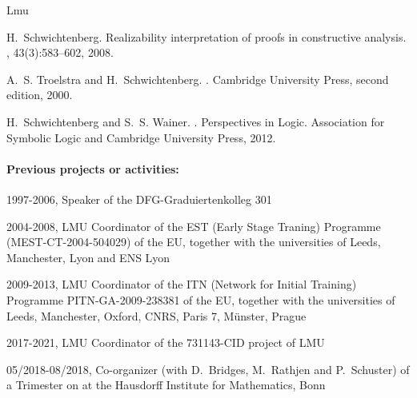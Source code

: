\begin{sitedescription}{Lmu}
\begin{compactitem}
\item H.~Schwichtenberg.
\newblock Realizability interpretation of proofs in constructive analysis.
, 43(3):583--602, 2008.

\item A.~S. Troelstra and H.~Schwichtenberg.
.
\newblock Cambridge University Press, second edition, 2000.

\item H.~Schwichtenberg and S.~S. Wainer.
.
\newblock Perspectives in Logic. Association for Symbolic Logic and Cambridge
  University Press, 2012.
\end{compactitem}

\paragraph*{Previous projects or activities:}

\begin{compactitem}
  \item 1997-2006, Speaker of the DFG-Graduiertenkolleg 301

\item 2004-2008, LMU Coordinator of the  EST (Early Stage Traning) Programme
   (MEST-CT-2004-504029) of the EU, together with the
universities of Leeds, Manchester, Lyon and ENS Lyon

\item 2009-2013, LMU Coordinator of the ITN (Network for Initial
    Training) Programme PITN-GA-2009-238381  of the
    EU, together with the universities of Leeds, Manchester, Oxford,
    CNRS, Paris 7, M\"unster, Prague

\item 2017-2021, LMU Coordinator of the 731143-CID project of LMU

\item 05/2018-08/2018, Co-organizer (with D.~Bridges, M.~Rathjen and
  P.~Schuster) of a Trimester on 
  at the Hausdorff Institute for Mathematics, Bonn
\end{compactitem}



\end{sitedescription}
